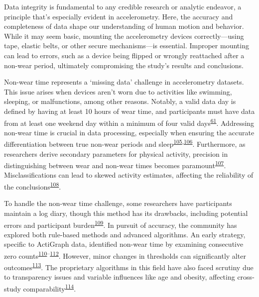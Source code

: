 \documentclass[
  10pt,
]{scrbook}
\begin{document}
Data integrity is fundamental to any credible research or analytic
endeavor, a principle that's especially evident in accelerometry. Here,
the accuracy and completeness of data shape our understanding of human
motion and behavior. While it may seem basic, mounting the accelerometry
devices correctly---using tape, elastic belts, or other secure
mechanisms---is essential. Improper mounting can lead to errors, such as
a device being flipped or wrongly reattached after a non-wear period,
ultimately compromising the study's results and conclusions.

Non-wear time represents a `missing data' challenge in accelerometry
datasets. This issue arises when devices aren't worn due to activities
like swimming, sleeping, or malfunctions, among other reasons. Notably,
a valid data day is defined by having at least 10 hours of wear time,
and participants must have data from at least one weekend day within a
minimum of four valid
days\textsuperscript{\protect\hyperlink{ref-migueles_accelerometer_2017}{61}}.
Addressing non-wear time is crucial in data processing, especially when
ensuring the accurate differentiation between true non-wear periods and
sleep\textsuperscript{\protect\hyperlink{ref-choi_validation_2011}{105},\protect\hyperlink{ref-winkler_identifying_2016}{106}}.
Furthermore, as researchers derive secondary parameters for physical
activity, precision in distinguishing between wear and non-wear times
becomes
paramount\textsuperscript{\protect\hyperlink{ref-matthews_2002}{107}}.
Misclassifications can lead to skewed activity estimates, affecting the
reliability of the
conclusions\textsuperscript{\protect\hyperlink{ref-king_2011}{108}}.

To handle the non-wear time challenge, some researchers have
participants maintain a log diary, though this method has its drawbacks,
including potential errors and participant
burden\textsuperscript{\protect\hyperlink{ref-ainsworth_recommendations_2012}{109}}.
In pursuit of accuracy, the community has explored both rule-based
methods and advanced algorithms. An early strategy, specific to
ActiGraph data, identified non-wear time by examining consecutive zero
counts\textsuperscript{\protect\hyperlink{ref-hecht_methodology_2009}{110}--\protect\hyperlink{ref-troiano_how_2020}{112}}.
However, minor changes in thresholds can significantly alter
outcomes\textsuperscript{\protect\hyperlink{ref-aadland_comparison_2018}{113}}.
The proprietary algorithms in this field have also faced scrutiny due to
transparency issues and variable influences like age and obesity,
affecting cross-study
comparability\textsuperscript{\protect\hyperlink{ref-toftager_accelerometer_2013}{114}}.
\end{document}
